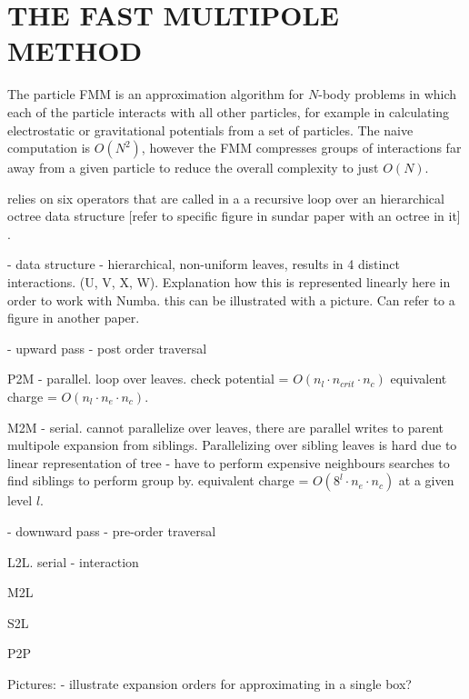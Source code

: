 \documentclass{IEEEcsmag}
\begin{document}




\section{THE FAST MULTIPOLE METHOD}

The particle FMM is an approximation algorithm for $N$-body problems in which each of the particle interacts with all other particles, for example in calculating electrostatic or gravitational potentials from a set of particles. The naive computation is $O(N^2)$, however the FMM compresses groups of interactions far away from a given particle to reduce the overall complexity to just $O(N)$.

relies on six operators that are called in a a recursive loop  over an hierarchical octree data structure [refer to specific figure in sundar paper with an octree in it] \cite{Sundar2007}.

- data structure - hierarchical, non-uniform leaves, results in 4 distinct interactions. (U, V, X, W). Explanation how this is represented linearly here in order to work with Numba.
this can be illustrated with a picture. Can refer to a figure in another paper.



- upward pass - post order traversal

P2M
- parallel. loop over leaves. check potential = $O(n_l \cdot n_{crit} \cdot n_c)$ equivalent charge = $O(n_l \cdot n_e \cdot  n_c)$.

M2M
- serial. cannot parallelize over leaves, there are parallel writes to parent multipole expansion from siblings. Parallelizing over sibling leaves is hard due to linear representation of tree - have to perform expensive neighbours searches to find siblings to perform group by. equivalent charge = $O(8^l \cdot n_e \cdot n_c)$ at a given level $l$.

- downward pass - pre-order traversal

L2L. serial - interaction

M2L

S2L

P2P

Pictures:
- illustrate expansion orders for approximating in a single box?
\end{document}
